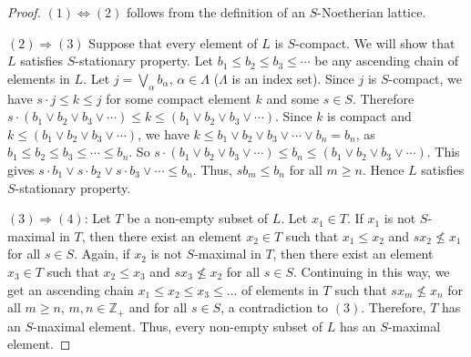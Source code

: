 \documentclass[10pt,twoside,a4]{amsart}
\numberwithin{equation}{section}
\theoremstyle{plain}
\theoremstyle{definition}
\begin{document}
\begin{proof}
	$(1) \Leftrightarrow  (2)$ follows from the definition of an $S$-Noetherian lattice.
	
	
	
	
	$(2) \Rightarrow (3)$ Suppose that every element of $L$ is $S$-compact. We will show that $L$ satisfies $S$-stationary property. Let $b_1 \leq b_2 \leq b_3 \leq \cdots$ be any ascending chain of elements in $L$. Let $j = \bigvee_{\alpha} b_{\alpha}$, $\alpha \in \Lambda$ ($\Lambda$ is an index set). Since $j$ is $S$-compact, we have $s \cdot j \leq k \leq j$ for some compact element $k$ and some $s \in S$. Therefore $s \cdot (b_1 \vee b_2 \vee b_3 \vee \cdots) \leq k \leq (b_1 \vee b_2 \vee b_3 \vee \cdots)$. Since $k$ is compact and $k \leq (b_1 \vee b_2 \vee b_3 \vee \cdots)$, we have $k \leq b_1 \vee b_2 \vee b_3 \vee \cdots \vee b_n =b_n$, as $b_1 \leq b_2 \leq b_3 \leq \cdots \leq b_n$. So $s \cdot (b_1 \vee b_2 \vee b_3 \vee \cdots) \leq b_n \leq (b_1 \vee b_2 \vee b_3 \vee \cdots)$. This gives $s \cdot b_1 \vee s \cdot b_2 \vee s \cdot b_3 \vee \cdots \leq  b_n$. Thus,  $s b_m \leq b_n$ for all $m \geq n$. Hence $L$  satisfies $S$-stationary property. 
	
	
$(3) \Rightarrow (4)$: Let $T$ be a non-empty subset of $L$. Let $x_1\in T$. If $x_1$ is not $S$-maximal in $T$, then there exist an element $x_2\in T$ such that $x_1\leq x_2$ and $sx_2\nleq x_1$ for all $s\in S$. Again, if $x_2$ is not $S$-maximal in $T$, then there exist an element $x_3\in T$ such that $x_2\leq x_3$ and $sx_3\nleq x_2$ for all $s\in S$. Continuing in this way, we get an ascending chain $x_1\leq x_2\leq x_3\leq \dots$ of elements in $T$ such that $sx_m\nleq x_n$ for all $m\geq n$, $m,n\in \mathbb{Z_+}$ and for all $s\in S$, a contradiction to $(3)$. Therefore, $T$ has an $S$-maximal element. Thus, every non-empty subset of $L$ has an $S$-maximal element.
	

\end{proof}
\end{document}
